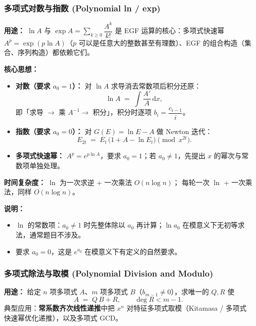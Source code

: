 

\subsubsection{多项式对数与指数 (Polynomial ln / exp)}

\textbf{用途：}
$\ln A$ 与 $\exp A=\sum_{k\ge 0}\dfrac{A^k}{k!}$ 是 EGF 运算的核心：多项式快速幂 $A^{p}=\exp(p\ln A)$（$p$ 可以是任意大的整数甚至有理数）、EGF 的组合构造（集合、序列构造）都依赖它们。

\textbf{核心思想：}
\begin{itemize}
    \item \textbf{对数（要求 $a_0=1$）：} 对 $\ln A$ 求导消去常数项后积分还原：
    \[ \ln A \;=\; \int \frac{A'}{A}\,\mathrm{d}x, \]
    即「求导 $\to$ 乘 $A^{-1} \to$ 积分」，积分时逐项 $b_i = \dfrac{c_{i-1}}{i}$。
    \item \textbf{指数（要求 $a_0=0$）：} 对 $G(E)=\ln E - A$ 做 Newton 迭代：
    \[ E_{2t} \;=\; E_t\,\bigl(1 + A - \ln E_t\bigr) \pmod{x^{2t}}. \]
    \item \textbf{多项式快速幂：} $A^p=e^{p\ln A}$，要求 $a_0=1$；若 $a_0\ne 1$，先提出 $x$ 的幂次与常数项单独处理。
\end{itemize}

\textbf{时间复杂度：} $\ln$ 为一次求逆 + 一次乘法 $O(n\log n)$； 每轮一次 $\ln$ + 一次乘法，同样 $O(n\log n)$。



\textbf{说明：}
\begin{itemize}
    \item $\ln$ 的常数项：$a_0\ne 1$ 时先整体除以 $a_0$ 再计算；$\ln a_0$ 在模意义下无初等求法，通常题目不涉及。
    \item {} 要求 $a_0=0$，这是 $e^{a_0}$ 在模意义下有定义的自然要求。
\end{itemize}

\subsubsection{多项式除法与取模 (Polynomial Division and Modulo)}

\textbf{用途：}
给定 $n$ 项多项式 $A$、$m$ 项多项式 $B$（$b_{m-1}\ne 0$），求唯一的 $Q,R$ 使
\[ A \;=\; Q\,B + R, \qquad \deg R < m-1. \]
典型应用：\textbf{常系数齐次线性递推}中把 $x^n$ 对特征多项式取模（Kitamasa / 多项式快速幂优化递推），以及多项式 GCD。

